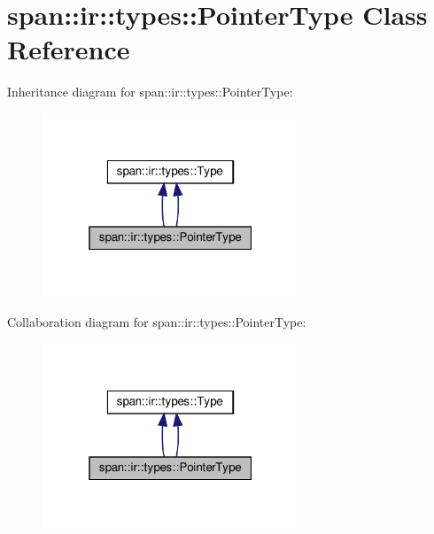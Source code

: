 \hypertarget{classspan_1_1ir_1_1types_1_1PointerType}{}\section{span\+:\+:ir\+:\+:types\+:\+:Pointer\+Type Class Reference}
\label{classspan_1_1ir_1_1types_1_1PointerType}


Inheritance diagram for span\+:\+:ir\+:\+:types\+:\+:Pointer\+Type\+:\nopagebreak
\begin{figure}[H]
\begin{center}
\leavevmode
\includegraphics[width=217pt]{classspan_1_1ir_1_1types_1_1PointerType__inherit__graph}
\end{center}
\end{figure}


Collaboration diagram for span\+:\+:ir\+:\+:types\+:\+:Pointer\+Type\+:\nopagebreak
\begin{figure}[H]
\begin{center}
\leavevmode
\includegraphics[width=217pt]{classspan_1_1ir_1_1types_1_1PointerType__coll__graph}
\end{center}
\end{figure}
